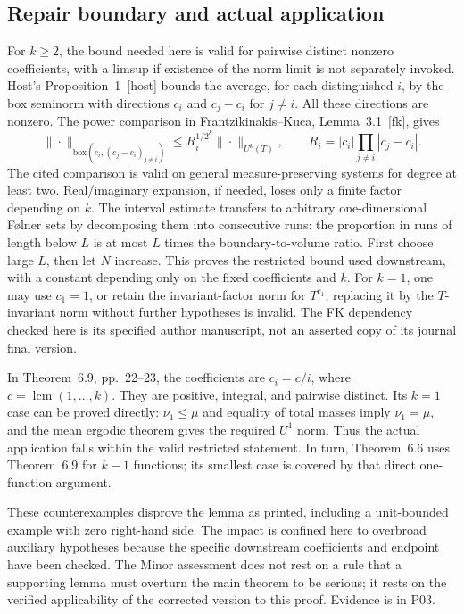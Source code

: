 \documentclass[10pt]{article}
\begin{document}
\subsection*{Repair boundary and actual application}
For \(k\geq2\), the bound needed here is valid for pairwise distinct nonzero coefficients, with a limsup if existence of the norm limit is not separately invoked. Host’s Proposition 1 [host] bounds the average, for each distinguished \(i\), by the box seminorm with directions \(c_i\) and \(c_j-c_i\) for \(j\ne i\). All these directions are nonzero. The power comparison in Frantzikinakis–Kuca, Lemma 3.1 [fk], gives \[\|\cdot\|_{\text{box}(c_i,(c_j-c_i)_{j\ne i})}
 \leq R_i^{1/2^k}\|\cdot\|_{U^k(T)},\qquad
 R_i=|c_i|\prod_{j\ne i}|c_j-c_i|.\] The cited comparison is valid on general measure-preserving systems for degree at least two. Real/imaginary expansion, if needed, loses only a finite factor depending on \(k\). The interval estimate transfers to arbitrary one-dimensional Følner sets by decomposing them into consecutive runs: the proportion in runs of length below \(L\) is at most \(L\) times the boundary-to-volume ratio. First choose large \(L\), then let \(N\) increase. This proves the restricted bound used downstream, with a constant depending only on the fixed coefficients and \(k\). For \(k=1\), one may use \(c_1=1\), or retain the invariant-factor norm for \(T^{c_1}\); replacing it by the \(T\)-invariant norm without further hypotheses is invalid. The FK dependency checked here is its specified author manuscript, not an asserted copy of its journal final version.\par
In Theorem 6.9, pp. 22–23, the coefficients are \(c_i=c/i\), where \(c=\operatorname{lcm}(1,\ldots,k)\). They are positive, integral, and pairwise distinct. Its \(k=1\) case can be proved directly: \(\nu_1\leq\mu\) and equality of total masses imply \(\nu_1=\mu\), and the mean ergodic theorem gives the required \(U^1\) norm. Thus the actual application falls within the valid restricted statement. In turn, Theorem 6.6 uses Theorem 6.9 for \(k-1\) functions; its smallest case is covered by that direct one-function argument.\par
These counterexamples disprove the lemma as printed, including a unit-bounded example with zero right-hand side. The impact is confined here to overbroad auxiliary hypotheses because the specific downstream coefficients and endpoint have been checked. The Minor assessment does not rest on a rule that a supporting lemma must overturn the main theorem to be serious; it rests on the verified applicability of the corrected version to this proof. Evidence is in P03.\par
\end{document}
